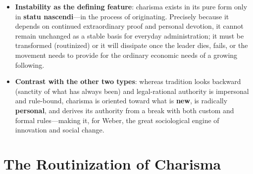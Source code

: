 \documentclass[12pt]{article}
\begin{document}
\begin{itemize}[leftmargin=*, itemsep=4pt]
    \item \textbf{Instability as the defining feature}: charisma exists in its pure form only in \textbf{statu nascendi}---in the process of originating. Precisely because it depends on continued extraordinary proof and personal devotion, it cannot remain unchanged as a stable basis for everyday administration; it must be transformed (routinized) or it will dissipate once the leader dies, fails, or the movement needs to provide for the ordinary economic needs of a growing following.
    \item \textbf{Contrast with the other two types}: whereas tradition looks backward (sanctity of what has always been) and legal-rational authority is impersonal and rule-bound, charisma is oriented toward what is \textbf{new}, is radically \textbf{personal}, and derives its authority from a break with both custom and formal rules---making it, for Weber, the great sociological engine of innovation and social change.
\end{itemize}

\section{The Routinization of Charisma}
\end{document}
